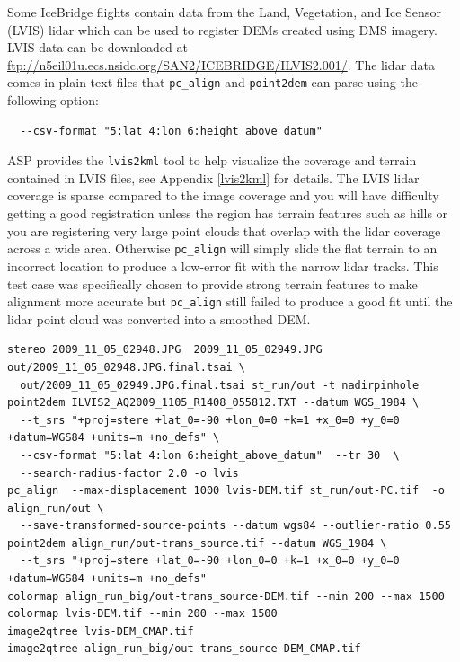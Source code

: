 Some IceBridge flights contain data from the Land, Vegetation, and Ice Sensor (LVIS)
lidar which can be used to register DEMs created using DMS
imagery.  LVIS data can be downloaded at
\url{ftp://n5eil01u.ecs.nsidc.org/SAN2/ICEBRIDGE/ILVIS2.001/}. The lidar data comes in plain text
files that \texttt{pc\_align} and \texttt{point2dem} can parse using the following option:
\begin{verbatim}  --csv-format "5:lat 4:lon 6:height_above_datum"  \end{verbatim}
ASP provides the \texttt{lvis2kml} tool to help visualize the coverage and terrain contained
in LVIS files, see Appendix \ref{lvis2kml} for details.
The LVIS lidar coverage is sparse compared to the image coverage and you will have difficulty
getting a good registration unless the region has terrain features such as hills or you are
registering very large point clouds that overlap with the lidar coverage across a wide area.
Otherwise \texttt{pc\_align} will simply slide the flat terrain to an incorrect location to
produce a low-error fit with the narrow lidar tracks.  This test case was specifically chosen
to provide strong terrain features to make alignment more accurate but \texttt{pc\_align} still
failed to produce a good fit until the lidar point cloud was converted into a smoothed DEM.

\begin{verbatim}
stereo 2009_11_05_02948.JPG  2009_11_05_02949.JPG  out/2009_11_05_02948.JPG.final.tsai \
  out/2009_11_05_02949.JPG.final.tsai st_run/out -t nadirpinhole
point2dem ILVIS2_AQ2009_1105_R1408_055812.TXT --datum WGS_1984 \
  --t_srs "+proj=stere +lat_0=-90 +lon_0=0 +k=1 +x_0=0 +y_0=0 +datum=WGS84 +units=m +no_defs" \
  --csv-format "5:lat 4:lon 6:height_above_datum"  --tr 30  \
  --search-radius-factor 2.0 -o lvis
pc_align  --max-displacement 1000 lvis-DEM.tif st_run/out-PC.tif  -o align_run/out \
  --save-transformed-source-points --datum wgs84 --outlier-ratio 0.55
point2dem align_run/out-trans_source.tif --datum WGS_1984 \
  --t_srs "+proj=stere +lat_0=-90 +lon_0=0 +k=1 +x_0=0 +y_0=0 +datum=WGS84 +units=m +no_defs"
colormap align_run_big/out-trans_source-DEM.tif --min 200 --max 1500
colormap lvis-DEM.tif --min 200 --max 1500
image2qtree lvis-DEM_CMAP.tif
image2qtree align_run_big/out-trans_source-DEM_CMAP.tif
\end{verbatim}

